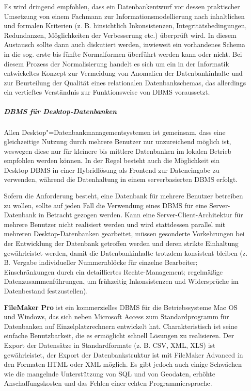 Es wird dringend empfohlen, dass ein Datenbankentwurf vor dessen praktischer Umsetzung von einem Fachmann zur Informationsmodellierung nach inhaltlichen und formalen Kriterien (z. B. hinsichtlich Inkonsistenzen, Integritätsbedingungen, Redundanzen, Möglichkeiten der Verbesserung etc.) überprüft wird. In diesem Austausch sollte dann auch diskutiert werden, inwieweit ein vorhandenes Schema in die sog. erste bis fünfte Normalformen überführt werden kann oder nicht. Bei diesem Prozess der Normalisierung handelt es sich um ein in der Informatik entwickeltes Konzept zur Vermeidung von Anomalien der Datenbankinhalte und zur Beurteilung der Qualität eines relationalen Datenbankschemas, das allerdings ein vertieftes Verständnis zur Funktionsweise von DBMS voraussetzt.

\subparagraph{DBMS für Desktop-Datenbanken}
Allen Desktop"=Datenbankmanagementsystemen ist gemeinsam, dass eine gleichzeitige Nutzung durch mehrere Benutzer nur unzureichend möglich ist, weswegen diese nur für kleinere bis mittlere Datenbanken im lokalen Betrieb empfohlen werden können. In der Regel besteht auch die Möglichkeit ein Desktop-DBMS in einer Hybridlösung als Frontend zur Dateneingabe zu verwenden, während die Datenhaltung in einem serverbasierten DBMS erfolgt.

Sofern die Anforderung besteht, eine Datenbank für mehrere Benutzer betreiben zu wollen, sollte auf jeden Fall die Verwendung eines DBMS für eine Server-Datenbank in Betracht gezogen werden. Kann eine Server-Client-Architektur für mehrere Benutzer nicht realisiert werden und wird stattdessen parallel mit mehreren Desktop-Datenbanken gearbeitet, müssen gesonderte Vorkehrungen bei der Entwicklung der Datenbank getroffen werden und deren strikte Einhaltung gewährleistet werden, damit die Datenbankinhalte trotzdem konsistent bleiben (z. B. Vergabe individueller Nummernblöcke für einzelne Bearbeiter; Einschränkungen durch ein detailliertes Rechte-Management; regelmäßige Datenzusammenführungen, um frühzeitig Inkonsistenzen und Widersprüche im Datenbestand festzustellen).

{\bfseries FileMaker Pro} ist ein kommerzielles DBMS für die Betriebssysteme Mac OS und Windows, das sich neben Microsoft Access zum Standardprogramm für Datenbanken auf Einzelplatzrechnern entwickelt hat. Charakteristisch ist seine einfache Benutzbarkeit, die es ermöglicht schnell Lösungen zu realisieren. Der Export der Datensätze in Standardformate (z. B. CSV, XML, XLS) ist gewährleistet, der Export der Datenbankstruktur ist mit FileMaker Advanced in den Formaten HTML oder XML möglich. Es gibt jedoch auch einige Schwächen wie die mangelnde Unterstützung von SQL und von Geodaten, erhöhte Anschaffungskosten und das Fehlen einer echten Programmiersprache.


